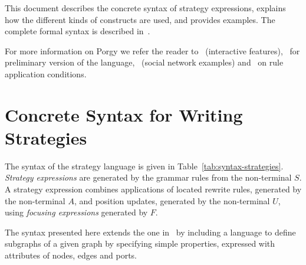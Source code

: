 \documentclass[a4paper,10pt,runningheads]{llncs}
\newcommand{\PORGY}{{\sc Porgy}\xspace}
\begin{document}
This document describes the concrete syntax of strategy expressions, explains how 
 the different kinds of constructs  %
are used, and provides examples. The complete formal syntax is described in~\cite{fernandezhal-01251871}.%
 
For more information on \PORGY we refer the reader to~\cite{pinaud:hal-00682550} (interactive features),~\cite{fernandezhal-01251871} for preliminary version of the language,~\cite{fernandez2018} (social network examples) and~\cite{Varga19} on rule application conditions.


\section*{Concrete Syntax for Writing Strategies}\label{syntaxgrammar}
The syntax of the strategy language is given in Table~\ref{tab:syntax-strategies}.
\emph{Strategy expressions} are generated by the grammar rules from
the non-terminal $S$. A strategy expression combines applications of
located rewrite rules, generated by the non-terminal $A$, and position
updates, generated by the non-terminal $U$, using \emph{focusing
  expressions} generated by $F$.  
  
The syntax presented here extends the one in~\cite{FKN:Lopstr} by
including a language to define subgraphs of a given graph by specifying
simple properties, expressed with attributes of nodes, edges and ports.
\end{document}
